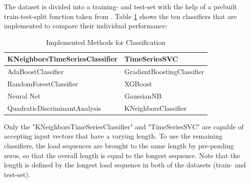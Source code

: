 The dataset is divided into a training- and test-set with the help of a prebuilt train-test-split function taken from \cite{SKlearn}. Table \ref{methods} shows the ten classifiers that are implemented to compare their individual performance:



\begin{table}
	\begin{center}
		\begin{tabular}{|| l | l ||}\hline
			\rule{0pt}{2ex}KNeighborsTimeSeriesClassifier \cite{tslearn} & TimeSeriesSVC \cite{tslearn}\\	\hline
			AdaBoostClassifier \cite{SKlearn} & GradientBoostingClassifier \cite{SKlearn} \\ \hline
			RandomForestClassifier \cite{SKlearn} & XGBoost\cite{XG}\\ \hline
			Neural Net \cite{SKlearn} & GaussianNB \cite{SKlearn} \\ \hline
			QuadraticDiscriminantAnalysis \cite{SKlearn} & KNeighborsClassifier \cite{SKlearn} \\ \hline
		\end{tabular}
		\caption{Implemented Methods for Classification}
		\label{methods}
	\end{center}
	\vspace{-4mm}
\end{table}

Only the "KNeighborsTimeSeriesClassifier" and "TimeSeriesSVC" are capable of accepting input vectors that have a varying length. To use the remaining classifiers, the load sequences are brought to the same length by pre-pending zeros, so that the overall length is equal to the longest sequence. Note that the length is defined by the longest load sequence in both of the datasets (train- and test-set).




